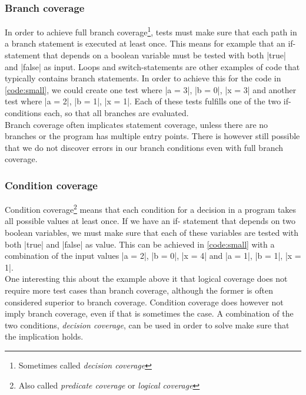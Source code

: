 \subsubsection{Branch coverage}

In order to achieve full branch coverage\footnote{Sometimes called
\emph{decision coverage}}, tests must make sure that each path in a
branch statement is executed at least once. This means for example that
an if-statement that depends on a boolean variable must be tested with
both |true| and |false| as input. Loops and switch-statements are other
examples of code that typically contains branch statements. In order to
achieve this for the code in \ref{code:small}, we could create one test
where |a = 3|, |b = 0|, |x = 3| and another test where |a = 2|, |b = 1|,
|x = 1|. Each of these tests fulfills one of the two if-conditions
each, so that all branches are evaluated.\\

Branch coverage often implicates statement coverage, unless there are no
branches or the program has multiple entry points. There is however
still possible that we do not discover errors in our branch conditions
even with full branch coverage.\\


\subsubsection{Condition coverage}

Condition coverage\footnote{Also called \emph{predicate coverage} or
\emph{logical coverage}} means that each condition for a decision in a
program takes all possible values at least once. If we have an if-
statement that depends on two boolean variables, we must make sure that
each of these variables are tested with both |true| and |false| as
value. This can be achieved in \ref{code:small} with a combination of
the input values |a = 2|, |b = 0|, |x = 4| and |a = 1|, |b = 1|,
|x = 1|.\\

One interesting this about the example above it that logical coverage
does not require more test cases than branch coverage, although the
former is often considered superior to branch coverage. Condition
coverage does however not imply branch coverage, even if that is
sometimes the case. A combination of the two conditions,
\emph{decision coverage}, can be used in order to solve make
sure that the implication holds.\\


